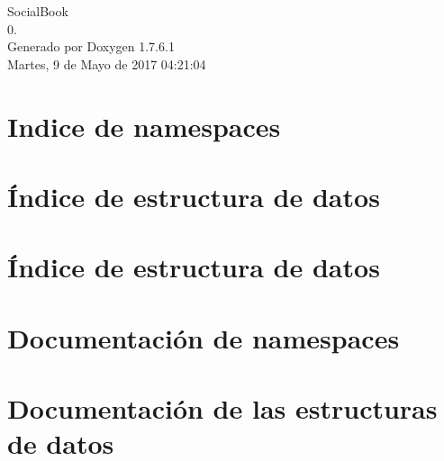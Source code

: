 \documentclass[a4paper]{book}
\begin{document}
\hypersetup{pageanchor=false,citecolor=blue}
\begin{titlepage}
\vspace*{7cm}
\begin{center}
{\Large \-Social\-Book \\[1ex]\large 0. }\\
\vspace*{1cm}
{\large \-Generado por Doxygen 1.7.6.1}\\
\vspace*{0.5cm}
{\small Martes, 9 de Mayo de 2017 04:21:04}\\
\end{center}
\end{titlepage}
\clearemptydoublepage
{}
\tableofcontents
\clearemptydoublepage
{}
\hypersetup{pageanchor=true,citecolor=blue}
\chapter{\-Indice de namespaces}

\chapter{Índice de estructura de datos}

\chapter{Índice de estructura de datos}

\chapter{\-Documentación de namespaces}

\chapter{\-Documentación de las estructuras de datos}
































\printindex
\end{document}
